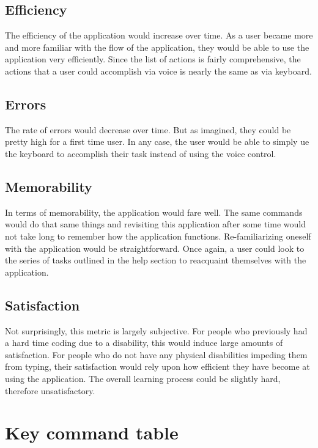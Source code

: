 \documentclass[11pt, oneside]{article}
\begin{document}
\subsection{Efficiency}
The efficiency of the application would increase over time. As a user became more and more familiar with the flow of the application, they would be able to use the application very efficiently. Since the list of actions is fairly comprehensive, the actions that a user could accomplish via voice is nearly the same as via keyboard.

\subsection{Errors}
The rate of errors would decrease over time. But as imagined, they could be pretty high for a first time user. In any case, the user would be able to simply ue the keyboard to accomplish their task instead of using the voice control.

\subsection{Memorability}
In terms of memorability, the application would fare well. The same commands would do that same things and revisiting this application after some time would not take long to remember how the application functions. Re-familiarizing oneself with the application would be straightforward. Once again, a user could look to the series of tasks outlined in the help section to reacquaint themselves with the application.

\subsection{Satisfaction}
Not surprisingly, this metric is largely subjective. For people who previously had a hard time coding due to a disability, this would induce large amounts of satisfaction. For people who do not have any physical disabilities impeding them from typing, their satisfaction would rely upon how efficient they have become at using the application. The overall learning process could be slightly hard, therefore unsatisfactory.

\pagebreak


\section{Key command table}
\label{sec:command_table}
\end{document}
